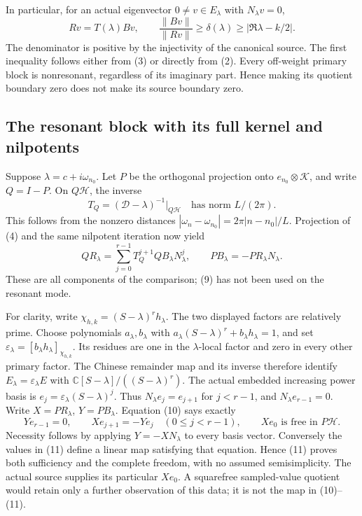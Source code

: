 In particular, for an actual eigenvector \(0\ne v\in E_\lambda\)
with \(N_\lambda v=0\),
\[
 Rv=T(\lambda)Bv,\qquad
 \frac{\|Bv\|}{\|Rv\|}\ge\delta(\lambda)
 \ge|\Re\lambda-k/2|.
 \tag{8}
\]
The denominator is positive by the injectivity of the canonical
source. The first inequality follows either from (3) or directly
from (2). Every off-weight primary block is nonresonant, regardless
of its imaginary part. Hence making its quotient boundary zero does
not make its source boundary zero.

\subsection{The resonant block with its full kernel and nilpotents}
Suppose \(\lambda=c+i\omega_{n_0}\). Let \(P\) be the orthogonal
projection onto \(e_{n_0}\otimes\mathcal K\), and write \(Q=I-P\).
On \(Q\mathscr H\), the inverse
\[
 T_Q=(\mathscr D-\lambda)^{-1}|_{Q\mathscr H}
 \quad\text{has norm }L/(2\pi).
 \tag{9}
\]
This follows from the nonzero distances
\(|\omega_n-\omega_{n_0}|=2\pi|n-n_0|/L\).
Projection of (4) and the same nilpotent iteration now yield
\[
 QR_\lambda=\sum_{j=0}^{r-1}T_Q^{j+1}QB_\lambda N_\lambda^j,
 \qquad
 PB_\lambda=-PR_\lambda N_\lambda.
 \tag{10}
\]
These are all components of the comparison; (9) has not been used
on the resonant mode.

For clarity, write \(\chi_{h,k}=(S-\lambda)^r h_\lambda\).
The two displayed factors are relatively prime. Choose polynomials
\(a_\lambda,b_\lambda\) with
\(a_\lambda(S-\lambda)^r+b_\lambda h_\lambda=1\), and set
\(\varepsilon_\lambda=[b_\lambda h_\lambda]_{\chi_{h,k}}\).
Its residues are one in the \(\lambda\)-local factor and zero in
every other primary factor. The Chinese remainder map and its
inverse therefore identify \(E_\lambda=\varepsilon_\lambda E\)
with \(\mathbb C[S-\lambda]/((S-\lambda)^r)\).
The actual embedded increasing power basis is
\(e_j=\varepsilon_\lambda(S-\lambda)^j\). Thus
\(N_\lambda e_j=e_{j+1}\) for \(j<r-1\), and
\(N_\lambda e_{r-1}=0\). Write \(X=PR_\lambda\),
\(Y=PB_\lambda\). Equation (10) says exactly
\[
 Ye_{r-1}=0,\qquad
 Xe_{j+1}=-Ye_j\quad(0\le j<r-1),\qquad
 Xe_0\text{ is free in }P\mathscr H.
 \tag{11}
\]
Necessity follows by applying \(Y=-XN_\lambda\) to every basis
vector. Conversely the values in (11) define a linear map satisfying
that equation. Hence (11) proves both sufficiency and the complete
freedom, with no assumed semisimplicity. The actual source supplies
its particular \(Xe_0\). A squarefree sampled-value quotient would
retain only a further observation of this data; it is not the map
in (10)--(11).

